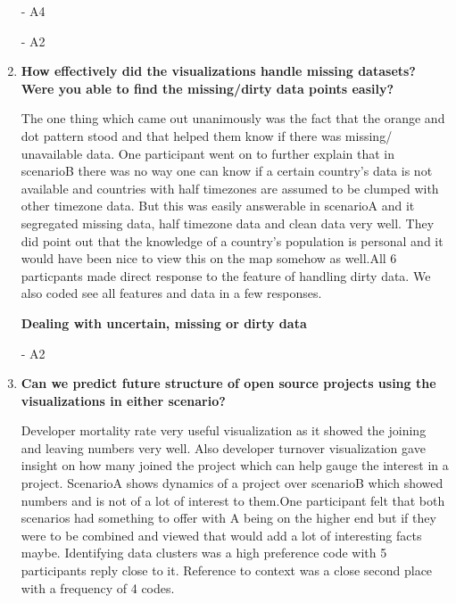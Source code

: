 \documentclass[seploa]{beavtex}
\begin{document}
\begin{enumerate}
{\em {}} - A4

{\em {}} - A2

\item \textbf{How effectively did the visualizations handle missing datasets? Were you able to find the missing/dirty data points easily?}

The one thing which came out unanimously was the fact that the orange and dot pattern stood and that helped them know if there was missing/ unavailable data. One participant went on to further explain that in scenarioB there was no way one can know if a certain country's data is not available and countries with half timezones are assumed to be clumped with other timezone data. But this was easily answerable in scenarioA and it segregated missing data, half timezone data and clean data very well. They did point out that the knowledge of a country's population is personal and it would have been nice to view this on the map somehow as well.All 6 particpants made direct response to the feature of handling dirty data. We also coded see all features and data in a few responses.

\textbf{Dealing with uncertain, missing or dirty data}

{\em {}} - A2

\item \textbf{Can we predict future structure of open source projects using the visualizations in either scenario?}

Developer mortality rate very useful visualization as it showed the joining and leaving numbers very well. Also developer turnover visualization gave insight on how many joined the project which can help gauge the interest in a project. ScenarioA shows dynamics of a project over scenarioB which showed numbers and is not of a lot of interest to them.One participant felt that both scenarios had something to offer with A being on the higher end but if they were to be combined and viewed that would add a lot of interesting facts maybe. Identifying data clusters was a high preference code with 5 participants reply close to it. Reference to context was a close second place with a frequency of 4 codes.


\end{enumerate}
\end{document}
